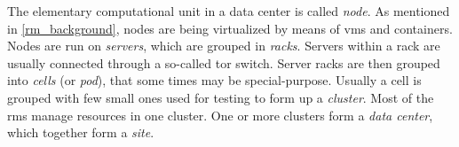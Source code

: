 
The elementary computational unit in a data center is called \textit{node}.
As mentioned in \autoref{rm_background}, nodes are being virtualized by means of \glspl{vm} and containers.
Nodes are run on \textit{servers}, which are grouped in \textit{racks}.
Servers within a rack are usually connected through a so-called \gls{tor} switch.
Server racks are then grouped into \textit{cells} (or \textit{pod}), that some times may be special-purpose.
Usually a cell is grouped with few small ones used for testing to form up a \textit{cluster}.
Most of the \glspl{rm} manage resources in one cluster.
One or more clusters form a \textit{data center}, which together form a \textit{site}.